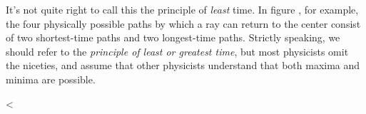 It's not quite right to call this
the principle of \emph{least} time. In figure , for
example, the four physically possible paths by which a ray
can return to the center consist of two shortest-time paths
and two longest-time paths. Strictly speaking, we should
refer to the \emph{principle of least or greatest time}, but
most physicists omit the niceties, and assume that other
physicists understand that both maxima and minima are possible.


<%
